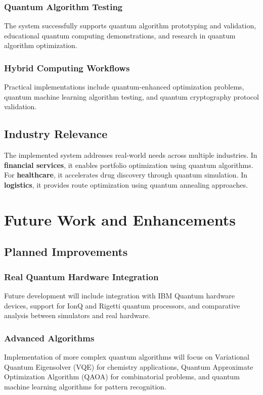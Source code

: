 \documentclass[onecolumn]{IEEEtran}
\begin{document}
\subsubsection{Quantum Algorithm Testing}
The system successfully supports quantum algorithm prototyping and validation, educational quantum computing demonstrations, and research in quantum algorithm optimization.

\subsubsection{Hybrid Computing Workflows}
Practical implementations include quantum-enhanced optimization problems, quantum machine learning algorithm testing, and quantum cryptography protocol validation.

\subsection{Industry Relevance}

The implemented system addresses real-world needs across multiple industries. In \textbf{financial services}, it enables portfolio optimization using quantum algorithms. For \textbf{healthcare}, it accelerates drug discovery through quantum simulation. In \textbf{logistics}, it provides route optimization using quantum annealing approaches.



\section{Future Work and Enhancements}

\subsection{Planned Improvements}

\subsubsection{Real Quantum Hardware Integration}
Future development will include integration with IBM Quantum hardware devices, support for IonQ and Rigetti quantum processors, and comparative analysis between simulators and real hardware.

\subsubsection{Advanced Algorithms}
Implementation of more complex quantum algorithms will focus on Variational Quantum Eigensolver (VQE) for chemistry applications, Quantum Approximate Optimization Algorithm (QAOA) for combinatorial problems, and quantum machine learning algorithms for pattern recognition.
\end{document}
